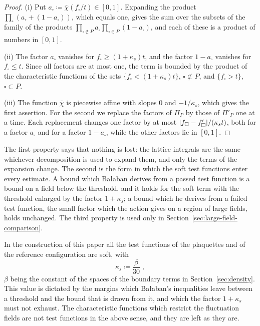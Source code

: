 \documentclass[11pt]{preprint}
\DeclarePairedDelimiter{\abs}{\lvert}{\rvert}
\numberwithin{equation}{section}
\theoremstyle{definition}
\theoremstyle{remark}
\theoremstyle{plain}
\begin{document}
\begin{proof}
(i) Put $a_\square \coloneqq \bar\chi(f_\square/t) \in [0, 1]$. Expanding the product $\prod_\square(a_\square + (1 - a_\square))$, which equals one, gives the sum over the subsets of the family of the products $\prod_{\square \notin P}a_\square\prod_{\square \in P}(1 - a_\square)$, and each of these is a product of numbers in $[0, 1]$.

(ii) The factor $a_\square$ vanishes for $f_\square \geq (1 + \kappa_s)t$, and the factor $1 - a_\square$ vanishes for $f_\square \leq t$. Since all factors are at most one, the term is bounded by the product of the characteristic functions of the sets $\{ f_\square < (1 + \kappa_s)t \}$, $\square \not\subset P$, and $\{ f_\square > t \}$, $\square \subset P$.

(iii) The function $\bar\chi$ is piecewise affine with slopes $0$ and $-1/\kappa_s$, which gives the first assertion. For the second we replace the factors of $\Pi_P$ by those of $\Pi'_P$ one at a time. Each replacement changes one factor by at most $\abs{f_\square - f'_\square}/(\kappa_st)$, both for a factor $a_\square$ and for a factor $1 - a_\square$, while the other factors lie in $[0, 1]$.
\end{proof}

The first property says that nothing is lost: the lattice integrals are the same whichever decomposition is used to expand them, and only the terms of the expansion change. The second is the form in which the soft test functions enter every estimate. A bound which Ba{\l}aban derives from a passed test function is a bound on a field below the threshold, and it holds for the soft term with the threshold enlarged by the factor $1 + \kappa_s$; a bound which he derives from a failed test function, the small factor which the action gives on a region of large fields, holds unchanged. The third property is used only in Section~\ref{sec:large-field-comparison}.

In the construction of this paper all the test functions of the plaquettes and of the reference configuration are soft, with
\begin{equation}\label{eq:soft-width}
    \kappa_s \coloneqq \frac{\beta}{30}\;,
\end{equation}
$\beta$ being the constant of the spaces of the boundary terms in Section~\ref{sec:density}. This value is dictated by the margins which Ba{\l}aban's inequalities leave between a threshold and the bound that is drawn from it, and which the factor $1 + \kappa_s$ must not exhaust. The characteristic functions which restrict the fluctuation fields are not test functions in the above sense, and they are left as they are.
\end{document}
